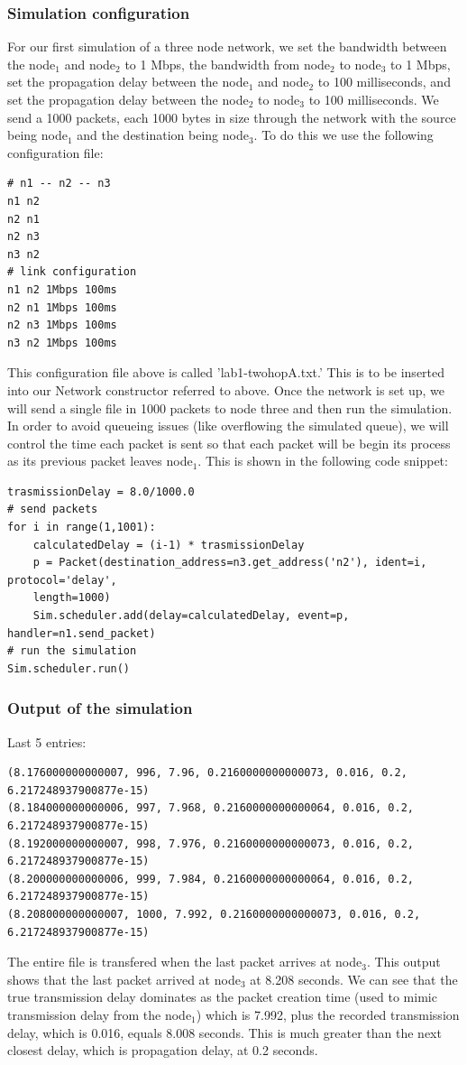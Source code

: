 \documentclass[fleqn,11pt]{article}
\begin{document}
\subsubsection{Simulation configuration}
For our first simulation of a three node network, we set the bandwidth between the node$_1$ and node$_2$ to 1 Mbps, the bandwidth from node$_2$ to node$_3$ to 1 Mbps, set the propagation delay between the node$_1$ and node$_2$ to 100 milliseconds, and set the propagation delay between the node$_2$ to node$_3$ to 100 milliseconds. We send a 1000 packets, each 1000 bytes in size through the network with the source being node$_1$ and the destination being node$_3$. To do this we use the following configuration file:
\begin{lstlisting}
# n1 -- n2 -- n3
n1 n2
n2 n1
n2 n3
n3 n2
# link configuration
n1 n2 1Mbps 100ms
n2 n1 1Mbps 100ms
n2 n3 1Mbps 100ms
n3 n2 1Mbps 100ms
\end{lstlisting}
This configuration file above is called 'lab1-twohopA.txt.' This is to be inserted into our Network constructor referred to above.
Once the network is set up, we will send a single file in 1000 packets to node three and then run the simulation. In order to avoid queueing issues (like overflowing the simulated queue), we will control the time each packet is sent so that each packet will be begin its process as its previous packet leaves node$_1$. This is shown in the following code snippet:    

\begin{lstlisting}
trasmissionDelay = 8.0/1000.0    
# send packets
for i in range(1,1001):
    calculatedDelay = (i-1) * trasmissionDelay
    p = Packet(destination_address=n3.get_address('n2'), ident=i, protocol='delay',
	length=1000)
    Sim.scheduler.add(delay=calculatedDelay, event=p, handler=n1.send_packet)
# run the simulation
Sim.scheduler.run() 
\end{lstlisting}
\subsubsection{Output of the simulation}
Last 5 entries:
\begin{lstlisting}
(8.176000000000007, 996, 7.96, 0.2160000000000073, 0.016, 0.2, 6.217248937900877e-15)
(8.184000000000006, 997, 7.968, 0.2160000000000064, 0.016, 0.2, 6.217248937900877e-15)
(8.192000000000007, 998, 7.976, 0.2160000000000073, 0.016, 0.2, 6.217248937900877e-15)
(8.200000000000006, 999, 7.984, 0.2160000000000064, 0.016, 0.2, 6.217248937900877e-15)
(8.208000000000007, 1000, 7.992, 0.2160000000000073, 0.016, 0.2, 6.217248937900877e-15)
\end{lstlisting}
The entire file is transfered when the last packet arrives at node$_3$. This output shows that the last packet arrived at node$_3$ at 8.208 seconds. We can see that the true transmission delay dominates as the packet creation time (used to mimic transmission delay from the node$_1$) which is 7.992, plus the recorded transmission delay, which is 0.016, equals 8.008 seconds. This is much greater than the next closest delay, which is propagation delay, at 0.2 seconds.
\end{document}
